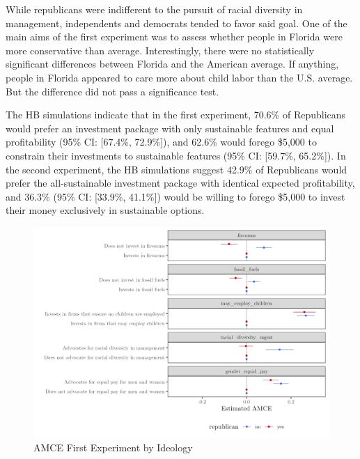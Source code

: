 \documentclass[
  12pt,
]{article}
\begin{document}
While republicans were indifferent to the pursuit of racial diversity in management, independents and democrats tended to favor said goal. One of the main aims of the first experiment was to assess whether people in Florida were more conservative than average. Interestingly, there were no statistically significant differences between Florida and the American average. If anything, people in Florida appeared to care more about child labor than the U.S. average. But the difference did not pass a significance test.

The HB simulations indicate that in the first experiment, 70.6\% of Republicans would prefer an investment package with only sustainable features and equal profitability (95\% CI: {[}67.4\%, 72.9\%{]}), and 62.6\% would forego \$5,000 to constrain their investments to sustainable features (95\% CI: {[}59.7\%, 65.2\%{]}). In the second experiment, the HB simulations suggest 42.9\% of Republicans would prefer the all-sustainable investment package with identical expected profitability, and 36.3\% (95\% CI: {[}33.9\%, 41.1\%{]}) would be willing to forego \$5,000 to invest their money exclusively in sustainable options.

\begin{figure}

{\centering \includegraphics{amce_byr_shorter} 

}

\caption{AMCE First Experiment by Ideology}\label{fig:amce1byr}
\end{figure}
\end{document}
